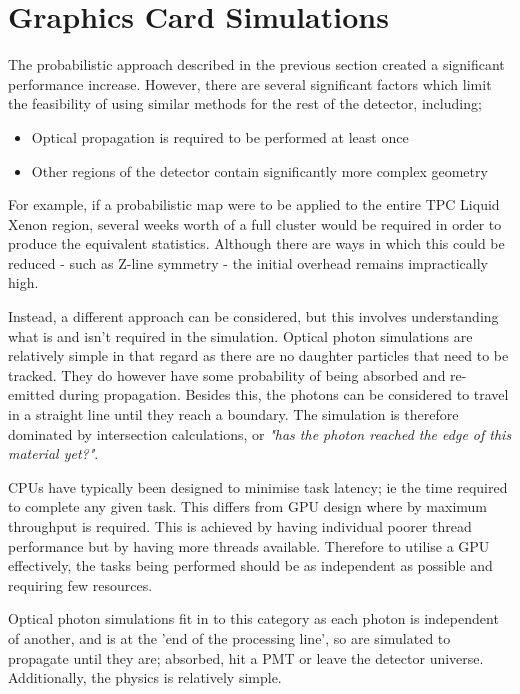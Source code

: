 \section{Graphics Card Simulations}

\par
The probabilistic approach described in the previous section created a significant performance increase. 
However, there are several significant factors which limit the feasibility of using similar methods for the rest of the detector, including;
\begin{itemize}
    \item Optical propagation is required to be performed at least once
    \item Other regions of the detector contain significantly more complex geometry
\end{itemize}
For example, if a probabilistic map were to be applied to the entire TPC Liquid Xenon region, several weeks worth of a full cluster would be required in order to produce the equivalent statistics.
Although there are ways in which this could be reduced - such as Z-line symmetry - the initial overhead remains impractically high.

\par
Instead, a different approach can be considered, but this involves understanding what is and isn't required in the simulation.
Optical photon simulations are relatively simple in that regard as there are no daughter particles that need to be tracked.
They do however have some probability of being absorbed and re-emitted during propagation.
Besides this, the photons can be considered to travel in a straight line until they reach a boundary.
The simulation is therefore dominated by intersection calculations, or \textit{"has the photon reached the edge of this material yet?"}.

\par
CPUs have typically been designed to minimise task latency; ie the time required to complete any given task.
This differs from GPU design where by maximum throughput is required. 
This is achieved by having individual poorer thread performance but by having more threads available.
Therefore to utilise a GPU effectively, the tasks being performed should be as independent as possible and requiring few resources.

\par
Optical photon simulations fit in to this category as each photon is independent of another, and is at the 'end of the processing line', so are simulated to propagate until they are; absorbed, hit a PMT or leave the detector universe.
Additionally, the physics is relatively simple.

